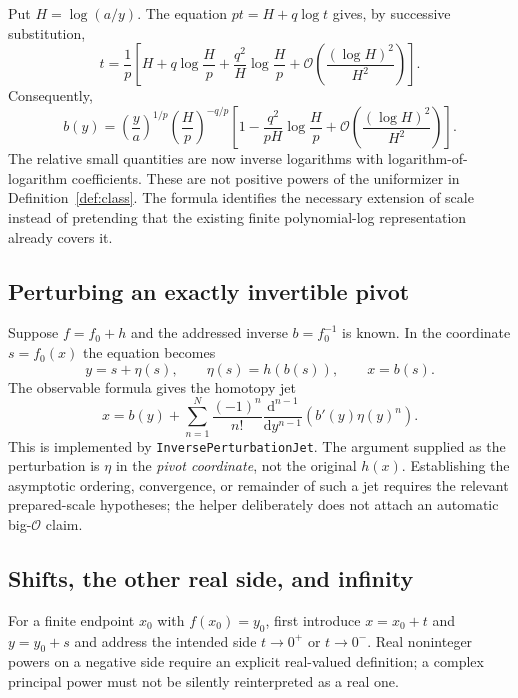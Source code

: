 \documentclass[11pt,a4paper]{article}
\numberwithin{equation}{section}
\theoremstyle{definition}
\theoremstyle{remark}
\newcommand{\dd}{\mathrm d}
\newcommand{\OO}{\mathcal O}
\newcommand{\code}[1]{\texttt{#1}}
\begin{document}
Put $H=\log(a/y)$. The equation $pt=H+q\log t$ gives, by successive
substitution,
\begin{equation}\label{eq:tlogexp}
 t=\frac1p\left[
 H+q\log\frac Hp+
 \frac{q^2}{H}\log\frac Hp+
 \OO\!\left(\frac{(\log H)^2}{H^2}\right)\right].
\end{equation}
Consequently,
\begin{equation}\label{eq:xlogexp}
 b(y)=\left(\frac ya\right)^{1/p}
 \left(\frac Hp\right)^{-q/p}
 \left[1-\frac{q^2}{pH}\log\frac Hp+
 \OO\!\left(\frac{(\log H)^2}{H^2}\right)\right].
\end{equation}
The relative small quantities are now inverse logarithms with
logarithm-of-logarithm coefficients. These are not positive powers of the
uniformizer in Definition~\ref{def:class}. The formula identifies the
necessary extension of scale instead of pretending that the existing
finite polynomial-log representation already covers it.

\subsection{Perturbing an exactly invertible pivot}

Suppose $f=f_0+h$ and the addressed inverse $b=f_0^{-1}$ is known. In the
coordinate $s=f_0(x)$ the equation becomes
\[
 y=s+\eta(s),\qquad \eta(s)=h(b(s)),\qquad x=b(s).
\]
The observable formula gives the homotopy jet
\begin{equation}\label{eq:pivotjet}
 x=b(y)+\sum_{n=1}^{N}\frac{(-1)^n}{n!}
 \frac{\dd^{n-1}}{\dd y^{n-1}}\left(b'(y)\eta(y)^n\right).
\end{equation}
This is implemented by \code{InversePerturbationJet}. The argument supplied
as the perturbation is $\eta$ in the \emph{pivot coordinate}, not the
original $h(x)$. Establishing the asymptotic ordering, convergence, or
remainder of such a jet requires the relevant prepared-scale hypotheses;
the helper deliberately does not attach an automatic big-$\OO$ claim.

\subsection{Shifts, the other real side, and infinity}

For a finite endpoint $x_0$ with $f(x_0)=y_0$, first introduce
$x=x_0+t$ and $y=y_0+s$ and address the intended side $t\to0^+$ or
$t\to0^-$. Real noninteger powers on a negative side require an explicit
real-valued definition; a complex principal power must not be silently
reinterpreted as a real one.
\end{document}
